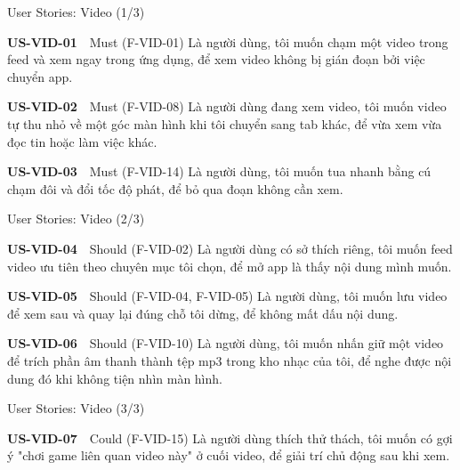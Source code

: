 \begin{frame}{User Stories: Video (1/3)}
\linespread{0.85}
\begin{block}{\scriptsize\bfseries US-VID-01}~~Must \tiny(F-VID-01)
{\scriptsize Là người dùng, tôi muốn chạm một video trong feed và xem ngay trong ứng dụng, để xem video không bị gián đoạn bởi việc chuyển app.}
\end{block}
\vspace{1pt}
\begin{block}{\scriptsize\bfseries US-VID-02}~~Must \tiny(F-VID-08)
{\scriptsize Là người dùng đang xem video, tôi muốn video tự thu nhỏ về một góc màn hình khi tôi chuyển sang tab khác, để vừa xem vừa đọc tin hoặc làm việc khác.}
\end{block}
\vspace{1pt}
\begin{block}{\scriptsize\bfseries US-VID-03}~~Must \tiny(F-VID-14)
{\scriptsize Là người dùng, tôi muốn tua nhanh bằng cú chạm đôi và đổi tốc độ phát, để bỏ qua đoạn không cần xem.}
\end{block}
\vspace{1pt}
\end{frame}

\begin{frame}{User Stories: Video (2/3)}
\linespread{0.85}
\begin{block}{\scriptsize\bfseries US-VID-04}~~Should \tiny(F-VID-02)
{\scriptsize Là người dùng có sở thích riêng, tôi muốn feed video ưu tiên theo chuyên mục tôi chọn, để mở app là thấy nội dung mình muốn.}
\end{block}
\vspace{1pt}
\begin{block}{\scriptsize\bfseries US-VID-05}~~Should \tiny(F-VID-04, F-VID-05)
{\scriptsize Là người dùng, tôi muốn lưu video để xem sau và quay lại đúng chỗ tôi dừng, để không mất dấu nội dung.}
\end{block}
\vspace{1pt}
\begin{block}{\scriptsize\bfseries US-VID-06}~~Should \tiny(F-VID-10)
{\scriptsize Là người dùng, tôi muốn nhấn giữ một video để trích phần âm thanh thành tệp mp3 trong kho nhạc của tôi, để nghe được nội dung đó khi không tiện nhìn màn hình.}
\end{block}
\vspace{1pt}
\end{frame}

\begin{frame}{User Stories: Video (3/3)}
\linespread{0.85}
\begin{block}{\scriptsize\bfseries US-VID-07}~~Could \tiny(F-VID-15)
{\scriptsize Là người dùng thích thử thách, tôi muốn có gợi ý "chơi game liên quan video này" ở cuối video, để giải trí chủ động sau khi xem.}
\end{block}
\vspace{1pt}
\end{frame}

